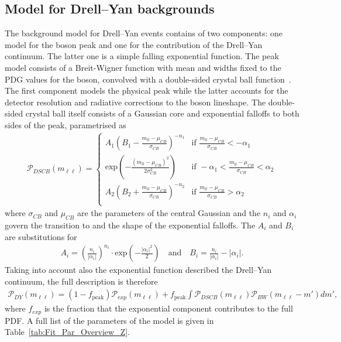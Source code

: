 \subsection{Model for Drell--Yan backgrounds}
\label{sec:Zmodel}
The background model for Drell--Yan events contains of two components: one model for the \Z boson peak and one for the contribution of the Drell--Yan continuum. The latter one is a simple falling exponential function. The peak model consists of a Breit-Wigner function with mean and widths fixed to the PDG values for the \Z boson, convolved with a double-sided crystal ball function~\cite{Crystal}. The first component models the physical peak while the latter accounts for the detector resolution and radiative corrections to the \Z boson lineshape. The double-sided crystal ball itself consists of a Gaussian core and exponential falloffs to both sides of the peak, parametrised as
\begin{eqnarray*}
\mathcal{P}_{DSCB}(m_{\ell\ell}) = \begin{cases} A_{1} (B_{1}-\frac{m_{ll}-\mu_{CB}}{\sigma_{CB}})^{-n_{1}} &\mbox{if } \frac{m_{ll}-\mu_{CB}}{\sigma_{CB}}<-\alpha_{1} \\
\textrm{exp}\left(-\frac{(m_{ll}-\mu_{CB})^2}{2\sigma_{CB}^2}\right) &\mbox{if } -\alpha_{1}<\frac{m_{ll}-\mu_{CB}}{\sigma_{CB}}<\alpha_{2} \\
A_{2} (B_{2}+\frac{m_{ll}-\mu_{CB}}{\sigma_{CB}})^{-n_{2}} &\mbox{if } \frac{m_{ll}-\mu_{CB}}{\sigma_{CB}}>\alpha_{2} \\
\end{cases}
\end{eqnarray*}
where $\sigma_{CB}$ and $\mu_{CB}$ are the parameters of the central Gaussian and the $n_i$ and $\alpha_i$ govern the transition to and the shape of the exponential falloffs. The $A_i$ and $B_i$ are substitutions for
\begin{eqnarray*}
A_{i} = \left(\frac{n_{i}}{|\alpha_{i}|}\right)^{n_{i}} \cdot \textrm{exp}\left(-\frac{|\alpha_{i}|^2}{2}\right) \quad \textrm{and}\quad B_{i} = \frac{n_{i}}{|\alpha_{i}|}-|\alpha_{i}| .
\end{eqnarray*}
Taking into account also the exponential function described the Drell--Yan continuum, the full description is therefore 
\begin{eqnarray*}
\mathcal{P}_{DY} (m_{\ell\ell}) = (1-f_\text{peak})\mathcal{P}_{exp}(m_{\ell\ell})+ f_\text{peak}\int \mathcal{P}_{DSCB}(m_{\ell\ell})\mathcal{P}_{BW}(m_{\ell\ell}-m') dm',
\end{eqnarray*}
where $f_{exp}$ is the fraction that the exponential component contributes to the full PDF. A full list of the parameters of the model is given in Table~\ref{tab:Fit_Par_Overview_Z}.


